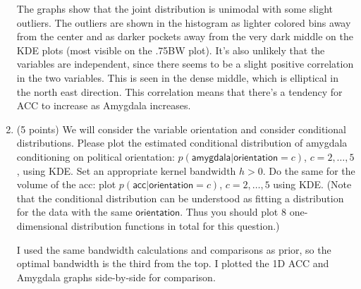 \documentclass[twoside,12pt]{article}
\begin{document}
\begin{enumerate}[label*=\arabic*.]
    The graphs show that the joint distribution is unimodal with some slight outliers. The outliers are shown in the histogram as lighter colored bins away from the center and as darker pockets away from the very dark middle on the KDE plots (most visible on the .75BW plot). It's also unlikely that the variables are independent, since there seems to be a slight positive correlation in the two variables. This is seen in the dense middle, which is elliptical in the north east direction. This correlation means that there's a tendency for ACC to increase as Amygdala increases. 


 \item (5 points) We will consider the variable \textsf{orientation} and consider conditional distributions. Please plot the estimated conditional distribution of \textsf{amygdala} conditioning on political \textsf{orientation}: $p(\textsf{amygdala}|\textsf{orientation}=c)$, $c = 2, \ldots, 5$, using KDE. Set an appropriate kernel bandwidth $h >0$.  Do the same for the volume of the \textsf{acc}: plot $p(\textsf{acc}|\textsf{orientation}=c)$, $c = 2, \ldots, 5$ using KDE. (Note that the conditional distribution can be understood as fitting a distribution for the data with the same $\textsf{orientation}$. Thus you should plot 8 one-dimensional distribution functions in total for this question.) 
 
 I used the same bandwidth calculations and comparisons as prior, so the optimal bandwidth is the third from the top. I plotted the 1D ACC and Amygdala graphs side-by-side for comparison.


\end{enumerate}
\end{document}
